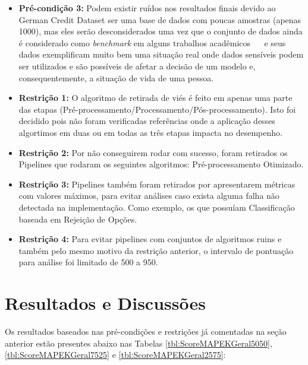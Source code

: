 \documentclass[portugues]{ic-tese}
\begin{document}
\begin{itemize}
\item \textbf{Pré-condição 3:} Podem existir ruídos nos resultados finais devido ao German Credit Dataset ser uma base de dados com poucas amostras (apenas 1000), mas eles serão desconsiderados uma vez que o conjunto de dados ainda é considerado como \textit{benchmark} em alguns trabalhos acadêmicos \citep{Kamiran_2011}~\citep{Feldman_2015}~\citep{Celis_2019} e seus dados exemplificam muito bem uma situação real onde dados sensíveis podem ser utilizados e são possíveis de afetar a decisão de um modelo e, consequentemente, a situação de vida de uma pessoa.

\item \textbf{Restrição 1:} O algoritmo de retirada de viés é feito em apenas uma parte das etapas (Pré-processamento/Processamento/Pós-processamento). Isto foi decidido pois não foram verificadas referências onde a aplicação desses algortimos em duas ou em todas as três etapas impacta no desempenho.

\item \textbf{Restrição 2:} Por não conseguirem rodar com sucesso, foram retirados os Pipelines que rodaram os seguintes algoritmos: Pré-processamento Otimizado.

\item \textbf{Restrição 3:} Pipelines também foram retirados por apresentarem métricas com valores máximos, para evitar análises caso exista alguma falha não detectada na implementação. Como exemplo, os que possuíam Classificação baseada em Rejeição de Opções.

\item \textbf{Restrição 4:} Para evitar pipelines com conjuntos de algoritmos ruins e também pelo mesmo motivo da restrição anterior, o intervalo de pontuação para análise foi limitado de 500 a 950.
\end{itemize}

\section{Resultados e Discussões}

Os resultados baseados nas pré-condições e restrições já comentadas na seção anterior estão presentes abaixo nas Tabelas \ref{tbl:ScoreMAPEKGeral5050}, \ref{tbl:ScoreMAPEKGeral7525} e \ref{tbl:ScoreMAPEKGeral2575}:
\end{document}
